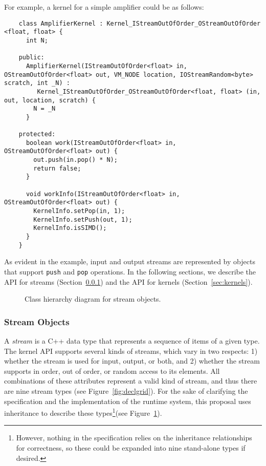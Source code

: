 \noindent For example, a kernel for a simple amplifier could be as follows:
{\small
\begin{verbatim}
    class AmplifierKernel : Kernel_IStreamOutOfOrder_OStreamOutOfOrder <float, float> {
      int N;

    public:
      AmplifierKernel(IStreamOutOfOrder<float> in, OStreamOutOfOrder<float> out, VM_NODE location, IOStreamRandom<byte> scratch, int _N) : 
         Kernel_IStreamOutOfOrder_OStreamOutOfOrder<float, float> (in, out, location, scratch) {
        N = _N
      }

    protected:
      boolean work(IStreamOutOfOrder<float> in, OStreamOutOfOrder<float> out) {
        out.push(in.pop() * N);
        return false;
      }

      void workInfo(IStreamOutOfOrder<float> in, OStreamOutOfOrder<float> out) {
        KernelInfo.setPop(in, 1);
        KernelInfo.setPush(out, 1);
        KernelInfo.isSIMD();
      }
    }  
\end{verbatim}}
As evident in the example, input and output streams are represented by
objects that support {\tt push} and {\tt pop} operations.  In the
following sections, we describe the API for streams
(Section~\ref{sec:kerstreams}) and the API for kernels
(Section~\ref{sec:kernels}).



\begin{figure}[t]
\begin{center}
\end{center}
\vspace{-12pt}
\caption{Class hierarchy diagram for stream objects.\protect\label{fig:inherit}}
\end{figure}

\subsubsection{Stream Objects}
\label{sec:kerstreams}

A {\it stream} is a C++ data type that represents a sequence of items
of a given type.  The kernel API supports several kinds of streams,
which vary in two respects: 1) whether the stream is used for input,
output, or both, and 2) whether the stream supports in order, out of
order, or random access to its elements.  All combinations of these
attributes represent a valid kind of stream, and thus there are nine
stream types (see Figure~\ref{fig:declgrid}).  For the sake of
clarifying the specification and the implementation of the runtime
system, this proposal uses inheritance to describe these
types\footnote{However, nothing in the specification relies on the
inheritance relationships for correctness, so these could be expanded
into nine stand-alone types if desired.}(see
Figure~\ref{fig:inherit}).

